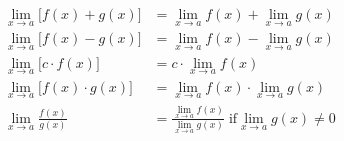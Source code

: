 \begin{equation}
\begin{split}
    \lim_{x \to a} \Big[ f(x) + g(x) \Big] &= \lim_{x \to a} f(x) + \lim_{x \to a} g(x) \\
    \lim_{x \to a} \Big[ f(x) - g(x) \Big] &= \lim_{x \to a} f(x) - \lim_{x \to a} g(x) \\
    \lim_{x \to a} \Big[ c \cdot f(x) \Big] &= c \cdot \lim_{x \to a} f(x) \\
    \lim_{x \to a} \Big[ f(x) \cdot g(x) \Big] &= \lim_{x \to a} f(x) \cdot \lim_{x \to a} g(x) \\
    \lim_{x \to a} \frac{f(x)}{g(x)} &= \frac{\lim_{x \to a} f(x)}{\lim_{x \to a}g(x)} \; \text{if} \lim_{x \to a}g(x) \neq 0
\end{split}
\end{equation}